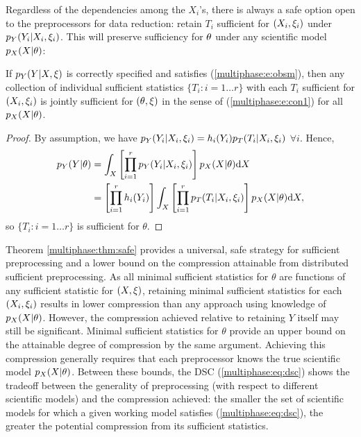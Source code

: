 Regardless of the dependencies among the $X_i$'s, there is always a safe option open to the preprocessors for data reduction: retain $T_i$ sufficient for $(X_i, \xi_i)$ under $p_Y(Y_i | X_i, \xi_i)$.
This will preserve sufficiency for $\theta$ under any scientific model $p_X(X | \theta)$:
%
\begin{theorem}\label{multiphase:thm:safe}
If $p_Y(Y | X, \xi)$ is correctly specified and satisfies (\ref{multiphase:e:obsm}), then any collection of individual sufficient statistics $\{T_i : i=1 \ldots r\}$ with each $T_i$ sufficient for $(X_i, \xi_i)$ is jointly sufficient for $(\theta, \xi)$ in the sense of (\ref{multiphase:e:con1}) for all $p_X(X | \theta)$.
\end{theorem}
\begin{proof}
By assumption, we have $p_Y(Y_i | X_i, \xi_i) = h_i(Y_i) p_T(T_i | X_i, \xi_i)$ $\forall i$. Hence,
\begin{align}
\nonumber
p_Y(Y | \theta) &= \int_X \left[ \prod_{i=1}^r p_Y(Y_i | X_i, \xi_i) \right] p_X(X | \theta) \mathrm{d} X \\
\nonumber
&= \left[ \prod_{i=1}^r h_i(Y_i) \right] \int_X \left[ \prod_{i=1}^r p_T(T_i | X_i, \xi_i) \right] p_X(X | \theta) \mathrm{d} X,
\end{align}
so $\{T_i : i=1 \ldots r\}$ is sufficient for $\theta$.
\end{proof}
%
Theorem \ref{multiphase:thm:safe} provides a universal, safe strategy for sufficient preprocessing and a lower bound on the compression attainable from distributed sufficient preprocessing.
As all minimal sufficient statistics for $\theta$ are functions of any sufficient statistic for $(X, \xi)$, retaining minimal sufficient statistics for each $(X_i, \xi_i)$ results in lower compression than any approach using knowledge of $p_X(X | \theta)$.
However, the compression achieved relative to retaining $Y$ itself may still be significant.
%
Minimal sufficient statistics for $\theta$ provide an upper bound on the attainable degree of compression by the same argument.
Achieving this compression generally requires that each preprocessor knows the true scientific model $p_X(X | \theta)$.
Between these bounds, the DSC (\ref{multiphase:eq:dsc}) shows the tradeoff between the generality of preprocessing (with respect to different scientific models) and the compression achieved: the smaller the set of scientific models for which a given working model satisfies (\ref{multiphase:eq:dsc}), the greater the potential compression from its sufficient statistics.


